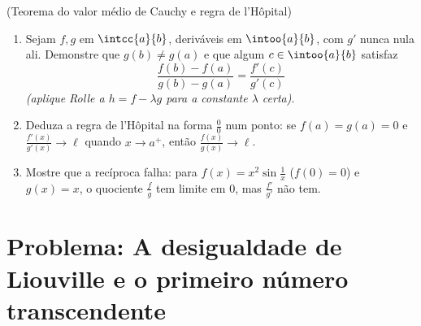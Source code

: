 \begin{exercise}[$\star\star\star$]\label{exo:b1:derivative:12}
(Teorema do valor médio de Cauchy e regra de l'Hôpital)
\begin{enumerate}
  \item Sejam $f, g$  em $\intcc{a}{b}$,
        deriváveis em $\intoo{a}{b}$, com $g'$ nunca nula
        ali. Demonstre que $g(b) \neq g(a)$ e que algum $c \in
        \intoo{a}{b}$ satisfaz
        \[
        \frac{f(b) - f(a)}{g(b) - g(a)} = \frac{f'(c)}{g'(c)}
        \]
        \emph{(aplique Rolle a $h = f - \lambda g$ para a constante
        $\lambda$ certa)}.
  \item Deduza a regra de l'Hôpital na forma $\frac00$ num
        ponto: se $f(a) = g(a) = 0$ e
        $\frac{f'(x)}{g'(x)} \to \ell$ quando $x \to a^+$, então
        $\frac{f(x)}{g(x)} \to \ell$.
  \item Mostre que a recíproca falha: para $f(x) = x^2\sin\frac1x$
        ($f(0) = 0$) e $g(x) = x$, o quociente
        $\frac{f}{g}$ tem limite em $0$, mas
        $\frac{f'}{g'}$ não tem.
\end{enumerate}
\end{exercise}

\section{Problema: A desigualdade de Liouville e o primeiro
número transcendente}

